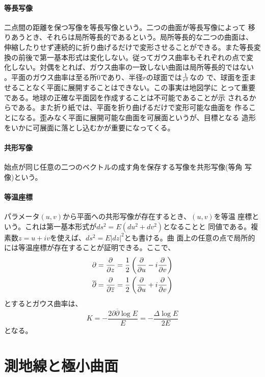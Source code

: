         \paragraph{等長写像}
            二点間の距離を保つ写像を等長写像という。二つの曲面が等長写像によって
            移りあうとき、それらは局所等長的であるという。局所等長的な二つの曲面は、
            伸縮したりせず連続的に折り曲げるだけで変形させることができる。また等長変
            換の前後で第一基本形式は変化しない。従ってガウス曲率もそれぞれの点で変
            化しない。対偶をとれば、ガウス曲率の一致しない曲面は局所等長的ではない
            。平面のガウス曲率は至る所0であり、半径$r$の球面では$\rec{r^2}$なの
            で、球面を歪ませることなく平面に展開することはできない。この事実は地図学に
            とって重要である。地球の正確な平面図を作成することは不可能であることが示
            されるからである。また折り紙では、平面を折り曲げるだけで変形可能な曲面を
            作ることになる。歪みなく平面に展開可能な曲面を可展面というが、目標となる
            造形をいかに可展面に落とし込むかが重要になってくる。
        \paragraph{共形写像}
            始点が同じ任意の二つのベクトルの成す角を保存する写像を共形写像(等角
            写像)という。
        \paragraph{等温座標}
            パラメータ$(u,v)$から平面への共形写像が存在するとき、$(u,v)$を等温
            座標という。これは第一基本形式が$ds^2 = E(du^2+dv^2)$となることと
            同値である。複素数$z=u+iv$を使えば、$ds^2=E|dz|^2$とも書ける。曲
            面上の任意の点で局所的には等温座標が存在することが証明できる。ここで、
            \begin{eqnarray*}
                \partial = \pd[]{z} = \rec{2}\lr{\pd[]{u}-i\pd[]{v}}\\
                \overline{\partial} = \pd[]{\overline{z}}
                = \rec{2}\lr{\pd[]{u}+i\pd[]{v}}
            \end{eqnarray*}
            とするとガウス曲率は、
                \[K = -\frac{2\partial\overline{\partial}\log E}{E}
                = -\frac{\Delta \log E}{2E}\]
            となる。
            
            
    \section{測地線と極小曲面}
